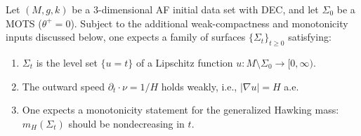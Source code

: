 \begin{theorem}\label{thm:WeakIMCF}
Let $(M, g, k)$ be a 3-dimensional AF initial data set with DEC, and let $\Sigma_0$ be a MOTS ($\theta^+ = 0$). Subject to the additional weak-compactness and monotonicity inputs discussed below, one expects a family of surfaces $\{\Sigma_t\}_{t \ge 0}$ satisfying:
\begin{enumerate}
    \item $\Sigma_t$ is the level set $\{u = t\}$ of a Lipschitz function $u: M \setminus \Sigma_0 \to [0, \infty)$.
    \item The outward speed $\partial_t \cdot \nu = 1/H$ holds weakly, i.e., $|\nabla u| = H$ a.e.
    \item One expects a monotonicity statement for the generalized Hawking mass: $m_H(\Sigma_t)$ should be nondecreasing in $t$.
\end{enumerate}
\end{theorem}

